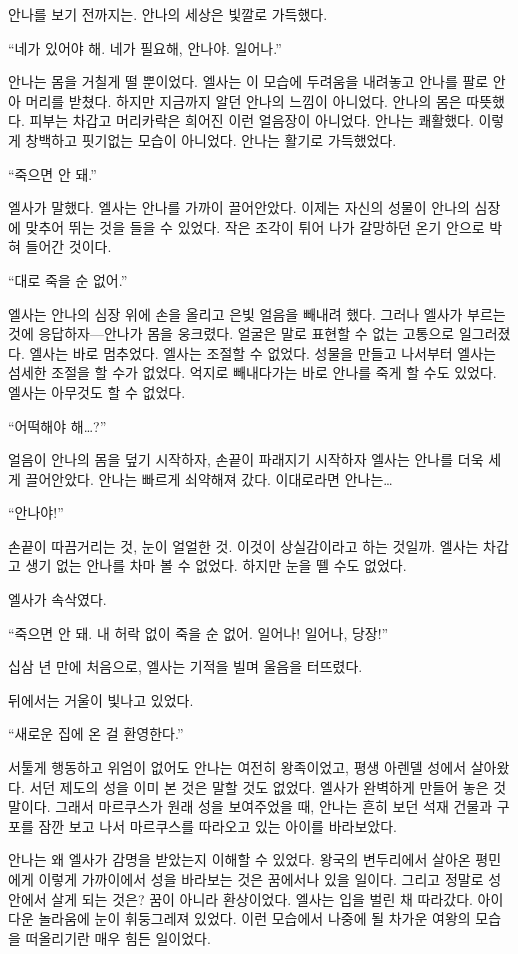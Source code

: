 안나를 보기 전까지는. 안나의 세상은 빛깔로 가득했다.

``네가 있어야 해. 네가 필요해, 안나야. 일어나.''

안나는 몸을 거칠게 떨 뿐이었다. 엘사는 이 모습에 두려움을 내려놓고 안나를 팔로 안아 머리를 받쳤다. 하지만 지금까지 알던 안나의 느낌이 아니었다. 안나의 몸은 따뜻했다. 피부는 차갑고 머리카락은 희어진 이런 얼음장이 아니었다. 안나는 쾌활했다. 이렇게 창백하고 핏기없는 모습이 아니었다. 안나는 활기로 가득했었다.

``죽으면 안 돼.''

엘사가 말했다. 엘사는 안나를 가까이 끌어안았다. 이제는 자신의 성물이 안나의 심장에 맞추어 뛰는 것을 들을 수 있었다. 작은 조각이 튀어 나가 갈망하던 온기 안으로 박혀 들어간 것이다.

``대로 죽을 순 없어.''

엘사는 안나의 심장 위에 손을 올리고 은빛 얼음을 빼내려 했다. 그러나 엘사가 부르는 것에 응답하자—안나가 몸을 웅크렸다. 얼굴은 말로 표현할 수 없는 고통으로 일그러졌다. 엘사는 바로 멈추었다. 엘사는 조절할 수 없었다. 성물을 만들고 나서부터 엘사는 섬세한 조절을 할 수가 없었다. 억지로 빼내다가는 바로 안나를 죽게 할 수도 있었다. 엘사는 아무것도 할 수 없었다.

``어떡해야 해\ldots?''

얼음이 안나의 몸을 덮기 시작하자, 손끝이 파래지기 시작하자 엘사는 안나를 더욱 세게 끌어안았다. 안나는 빠르게 쇠약해져 갔다. 이대로라면 안나는\ldots

``안나야!''

손끝이 따끔거리는 것, 눈이 얼얼한 것. 이것이 상실감이라고 하는 것일까. 엘사는 차갑고 생기 없는 안나를 차마 볼 수 없었다. 하지만 눈을 뗄 수도 없었다.

엘사가 속삭였다.

``죽으면 안 돼. 내 허락 없이 죽을 순 없어. 일어나! 일어나, 당장!''

십삼 년 만에 처음으로, 엘사는 기적을 빌며 울음을 터뜨렸다.

뒤에서는 거울이 빛나고 있었다.

\textbreak

\forceindent``새로운 집에 온 걸 환영한다.''

서툴게 행동하고 위엄이 없어도 안나는 여전히 왕족이었고, 평생 아렌델 성에서 살아왔다. 서던 제도의 성을 이미 본 것은 말할 것도 없었다. 엘사가 완벽하게 만들어 놓은 것 말이다. 그래서 마르쿠스가 원래 성을 보여주었을 때, 안나는 흔히 보던 석재 건물과 구포를 잠깐 보고 나서 마르쿠스를 따라오고 있는 아이를 바라보았다.

안나는 왜 엘사가 감명을 받았는지 이해할 수 있었다. 왕국의 변두리에서 살아온 평민에게 이렇게 가까이에서 성을 바라보는 것은 꿈에서나 있을 일이다. 그리고 정말로 성 안에서 살게 되는 것은? 꿈이 아니라 환상이었다. 엘사는 입을 벌린 채 따라갔다. 아이다운 놀라움에 눈이 휘둥그레져 있었다. 이런 모습에서 나중에 될 차가운 여왕의 모습을 떠올리기란 매우 힘든 일이었다.

